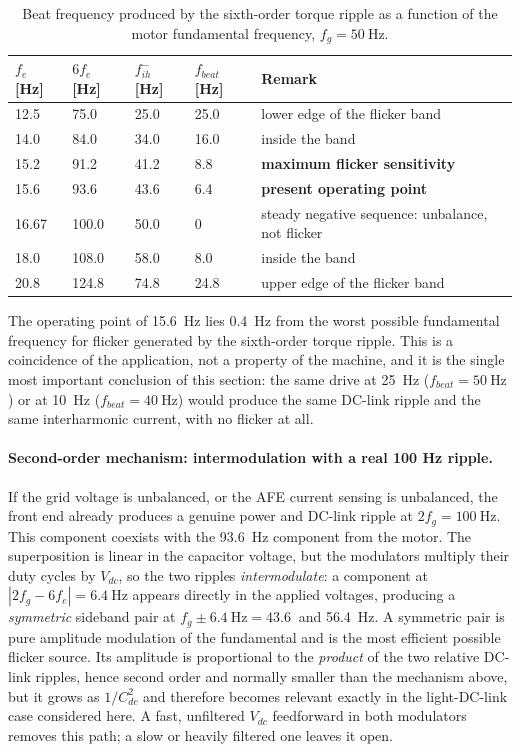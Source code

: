 \documentclass[11pt,a4paper]{article}
\begin{document}
\begin{table}[h]
\centering
\footnotesize
\begin{tabular}{lllll}
\toprule
$f_{e}$ [Hz] & $6f_{e}$ [Hz] & $f_{ih}^{-}$ [Hz] & $f_{beat}$ [Hz] & Remark \\
\midrule
12.5  & 75.0  & 25.0 & 25.0 & lower edge of the flicker band \\
14.0  & 84.0  & 34.0 & 16.0 & inside the band \\
15.2  & 91.2  & 41.2 & 8.8  & \textbf{maximum flicker sensitivity} \\
15.6  & 93.6  & 43.6 & 6.4  & \textbf{present operating point} \\
16.67 & 100.0 & 50.0 & 0    & steady negative sequence: unbalance, not flicker \\
18.0  & 108.0 & 58.0 & 8.0  & inside the band \\
20.8  & 124.8 & 74.8 & 24.8 & upper edge of the flicker band \\
\bottomrule
\end{tabular}
\caption{Beat frequency produced by the sixth-order torque ripple as a function
of the motor fundamental frequency, $f_{g}=\SI{50}{\hertz}$.}
\label{tab:crit}
\end{table}

The operating point of \SI{15.6}{\hertz} lies \SI{0.4}{\hertz} from the
worst possible fundamental frequency for flicker generated by the sixth-order
torque ripple. This is a coincidence of the application, not a property of the
machine, and it is the single most important conclusion of this section: the
same drive at \SI{25}{\hertz} ($f_{beat}=\SI{50}{\hertz}$) or at
\SI{10}{\hertz} ($f_{beat}=\SI{40}{\hertz}$) would produce the same DC-link
ripple and the same interharmonic current, with no flicker at all.

\paragraph{Second-order mechanism: intermodulation with a real 100 Hz ripple.}
If the grid voltage is unbalanced, or the AFE current sensing is unbalanced, the
front end already produces a genuine power and DC-link ripple at
$2f_{g}=\SI{100}{\hertz}$. This component coexists with the \SI{93.6}{\hertz}
component from the motor. The superposition is linear in the capacitor voltage,
but the modulators multiply their duty cycles by $V_{dc}$, so the two ripples
\emph{intermodulate}: a component at $|2f_{g}-6f_{e}|=\SI{6.4}{\hertz}$ appears
directly in the applied voltages, producing a \emph{symmetric} sideband pair at
$f_{g}\pm\SI{6.4}{\hertz}=\SI{43.6}{}$ and \SI{56.4}{\hertz}. A symmetric pair
is pure amplitude modulation of the fundamental and is the most efficient
possible flicker source. Its amplitude is proportional to the \emph{product} of
the two relative DC-link ripples, hence second order and normally smaller than
the mechanism above, but it grows as $1/C_{dc}^{2}$ and therefore becomes
relevant exactly in the light-DC-link case considered here. A fast, unfiltered
$V_{dc}$ feedforward in both modulators removes this path; a slow or heavily
filtered one leaves it open.
\end{document}
